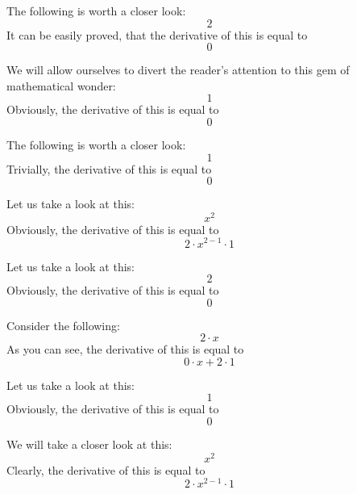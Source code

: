 \documentclass{article}
\begin{document}
The following is worth a closer look:
\begin{equation}
2 
\end{equation}
It can be easily proved, that the derivative of this is equal to
\begin{equation}
0 
\end{equation}

We will allow ourselves to divert the reader's attention to this gem of mathematical wonder:
\begin{equation}
1 
\end{equation}
Obviously, the derivative of this is equal to
\begin{equation}
0 
\end{equation}

The following is worth a closer look:
\begin{equation}
1 
\end{equation}
Trivially, the derivative of this is equal to
\begin{equation}
0 
\end{equation}

Let us take a look at this:
\begin{equation}
x ^{2 } 
\end{equation}
Obviously, the derivative of this is equal to
\begin{equation}
2 \cdot x ^{2 - 1 } \cdot 1 
\end{equation}

Let us take a look at this:
\begin{equation}
2 
\end{equation}
Obviously, the derivative of this is equal to
\begin{equation}
0 
\end{equation}

Consider the following:
\begin{equation}
2 \cdot x 
\end{equation}
As you can see, the derivative of this is equal to
\begin{equation}
0 \cdot x + 2 \cdot 1 
\end{equation}

Let us take a look at this:
\begin{equation}
1 
\end{equation}
Obviously, the derivative of this is equal to
\begin{equation}
0 
\end{equation}

We will take a closer look at this:
\begin{equation}
x ^{2 } 
\end{equation}
Clearly, the derivative of this is equal to
\begin{equation}
2 \cdot x ^{2 - 1 } \cdot 1 
\end{equation}
\end{document}
